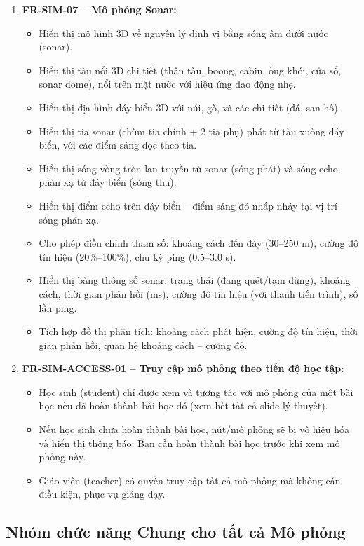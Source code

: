 \begin{enumerate}
    \item \textbf{FR-SIM-07 – Mô phỏng Sonar:}
    \begin{itemize}
        \item Hiển thị mô hình 3D về nguyên lý định vị bằng sóng âm dưới nước (sonar).
        \item Hiển thị tàu nổi 3D chi tiết (thân tàu, boong, cabin, ống khói, cửa sổ, sonar dome), nổi trên mặt nước với hiệu ứng dao động nhẹ.
        \item Hiển thị địa hình đáy biển 3D với núi, gò, và các chi tiết (đá, san hô).
        \item Hiển thị tia sonar (chùm tia chính + 2 tia phụ) phát từ tàu xuống đáy biển, với các điểm sáng dọc theo tia.
        \item Hiển thị sóng vòng tròn lan truyền từ sonar (sóng phát) và sóng echo phản xạ từ đáy biển (sóng thu).
        \item Hiển thị điểm echo trên đáy biển – điểm sáng đỏ nhấp nháy tại vị trí sóng phản xạ.
        \item Cho phép điều chỉnh tham số: khoảng cách đến đáy (30–250 m), cường độ tín hiệu (20\%–100\%), chu kỳ ping (0.5–3.0 s).
        \item Hiển thị bảng thông số sonar: trạng thái (đang quét/tạm dừng), khoảng cách, thời gian phản hồi (ms), cường độ tín hiệu (với thanh tiến trình), số lần ping.
        \item Tích hợp đồ thị phân tích: khoảng cách phát hiện, cường độ tín hiệu, thời gian phản hồi, quan hệ khoảng cách – cường độ.
    \end{itemize}
    \item \textbf{FR-SIM-ACCESS-01 – Truy cập mô phỏng theo tiến độ học tập}:
    \begin{itemize}
        \item Học sinh (student) chỉ được xem và tương tác với mô phỏng của một bài học nếu đã hoàn thành bài học đó (xem hết tất cả slide lý thuyết).
        \item Nếu học sinh chưa hoàn thành bài học, nút/mô phỏng sẽ bị vô hiệu hóa và hiển thị thông báo: Bạn cần hoàn thành bài học trước khi xem mô phỏng này.
        \item Giáo viên (teacher) có quyền truy cập tất cả mô phỏng mà không cần điều kiện, phục vụ giảng dạy.
    \end{itemize}
\end{enumerate}

\subsection{Nhóm chức năng Chung cho tất cả Mô phỏng}

